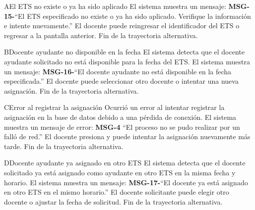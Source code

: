 \begin{UCtrayectoriaA}{A}{El ETS no existe o ya ha sido aplicado}
	\UCpaso[\UCactor] El sistema muestra un mensaje: {\bf MSG-15-}{``El ETS especificado no existe o ya ha sido aplicado. Verifique la información e intente nuevamente.''}
	\UCpaso[\UCactor] El docente puede reingresar el identificador del ETS o regresar a la pantalla anterior.
	\UCpaso Fin de la trayectoria alternativa.
\end{UCtrayectoriaA}
\begin{UCtrayectoriaA}{B}{Docente ayudante no disponible en la fecha}
	\UCpaso El sistema detecta que el docente ayudante solicitado no está disponible para la fecha del ETS.
	\UCpaso[\UCactor] El sistema muestra un mensaje: {\bf MSG-16-}{``El docente ayudante no está disponible en la fecha especificada.''}
	\UCpaso[\UCactor] El docente puede seleccionar otro docente o intentar una nueva asignación.
	\UCpaso Fin de la trayectoria alternativa.
\end{UCtrayectoriaA}
\begin{UCtrayectoriaA}{C}{Error al registrar la asignación}
	\UCpaso Ocurrió un error al intentar registrar la asignación en la base de datos debido a una pérdida de conexión.
	\UCpaso[\UCactor] El sistema muestra un mensaje de error:  {\bf MSG-4} {``El proceso no se pudo realizar por un falló de red.''}
	\UCpaso[\UCactor] El docente presiona  y puede intentar la asignación nuevamente más tarde.
	\UCpaso Fin de la trayectoria alternativa.
\end{UCtrayectoriaA}
\begin{UCtrayectoriaA}{D}{Docente ayudante ya asignado en otro ETS}
	\UCpaso El sistema detecta que el docente solicitado ya está asignado como ayudante en otro ETS en la misma fecha y horario.
	\UCpaso[\UCactor] El sistema muestra un mensaje: {\bf MSG-17-}{``El docente ya está asignado en otro ETS en el mismo horario.''}
	\UCpaso[\UCactor] El docente solicitante puede elegir otro docente o ajustar la fecha de solicitud.
	\UCpaso Fin de la trayectoria alternativa.
\end{UCtrayectoriaA}

